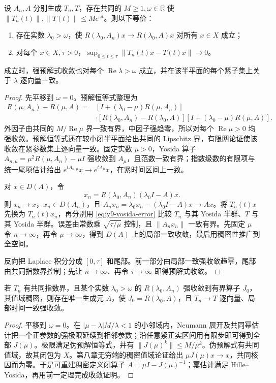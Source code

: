 \begin{theorem}\label{thm:y9-trotter-kato}
设 $A_n,A$ 分别生成 $T_n,T$，存在共同的 $M\ge1,\omega\in\mathbb R$ 使
$\|T_n(t)\|,\|T(t)\|\le Me^{\omega t}$。则以下等价：
\begin{enumerate}
 \item 存在实数 $\lambda_0>\omega$，使 $R(\lambda_0,A_n)x\to R(\lambda_0,A)x$ 对所有 $x\in X$ 成立；
 \item 对每个 $x\in X,\tau>0$，$\sup_{0\le t\le\tau}\|T_n(t)x-T(t)x\|\to0$。
\end{enumerate}
成立时，强预解式收敛也对每个 $\operatorname{Re}\lambda>\omega$ 成立，并在该半平面的每个紧子集上关于 $\lambda$ 逐向量一致。
\end{theorem}
\begin{proof}
先平移到 $\omega=0$。预解恒等式整理为
\[
\begin{aligned}
 R(\mu,A_n)-R(\mu,A)
 ={}&[I+(\lambda_0-\mu)R(\mu,A_n)]\\
 &\cdot[R(\lambda_0,A_n)-R(\lambda_0,A)]
 [I+(\lambda_0-\mu)R(\mu,A)].
\end{aligned}
\]
外因子由共同的 $M/\operatorname{Re}\mu$ 界一致有界，中因子强趋零，所以对每个 $\operatorname{Re}\mu>0$ 均强收敛。预解恒等式还在较小闭半平面给出共同的 Lipschitz 界，有限网论证使该收敛在紧参数集上逐向量一致。固定实数 $\mu>0$，Yosida 算子 $A_{n,\mu}=\mu^2R(\mu,A_n)-\mu I$ 强收敛到 $A_\mu$，且范数一致有界；指数级数的有限项与统一尾项估计给出 $e^{tA_{n,\mu}}x\to e^{tA_\mu}x$，在紧时间区间上一致。

对 $x\in D(A)$，令
\[
 x_n=R(\lambda_0,A_n)(\lambda_0I-A)x.
\]
则 $x_n\to x$，$x_n\in D(A_n)$，且 $A_nx_n=\lambda_0x_n-(\lambda_0I-A)x\to Ax$。将 $T_n(t)x$ 先换为 $T_n(t)x_n$，再分别用 \eqref{eq:y9-yosida-error} 比较 $T_n$ 与其 Yosida 半群、$T$ 与其 Yosida 半群。误差由常数乘 $\sqrt{\tau/\mu}$ 控制，且 $\|A_nx_n\|$ 一致有界。先固定 $\mu$ 令 $n\to\infty$，再令 $\mu\to\infty$，得到 $D(A)$ 上的局部一致收敛，最后用稠密性推广到全空间。

反向把 Laplace 积分分成 $[0,\tau]$ 和尾部。前一部分由局部一致强收敛趋零，尾部由共同指数界控制；先让 $n\to\infty$、再令 $\tau\to\infty$ 即得预解式收敛。
\end{proof}

\begin{corollary}[从稠密值域的预解式极限构造半群]
若 $T_n$ 有共同指数界，且某个实数 $\lambda_0>\omega$ 的 $R(\lambda_0,A_n)$ 强收敛到有界算子 $J_0$，其值域稠密，则存在唯一生成元 $A$，使 $J_0=R(\lambda_0,A)$，且 $T_n\to T$ 逐向量、局部时间一致强收敛。
\end{corollary}
\begin{proof}
平移到 $\omega=0$。在 $|\mu-\lambda|M/\lambda<1$ 的小邻域内，Neumann 展开及共同幂估计把一个正参数的强极限延续到相邻参数；沿任意紧正实区间用有限步即可得到全部 $J(\mu)$。极限满足伪预解恒等式，并有 $\|J(\mu)^k\|\le M/\mu^k$。伪预解式有共同值域，故其闭包为 $X$。第八章无穷端的稠密值域论证给出 $\mu J(\mu)x\to x$，共同核因而为零。于是可重建稠密定义闭算子 $A=\mu I-J(\mu)^{-1}$；幂估计满足 Hille--Yosida，再用前一定理完成收敛证明。
\end{proof}

